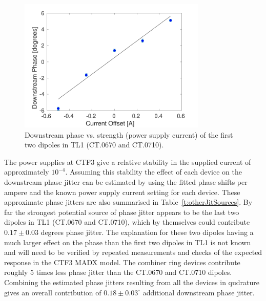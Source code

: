 \begin{figure}
  \centering
  \includegraphics[width=0.8\textwidth]{Figures/propagation/tl1670}
  \caption{Downstream phase vs. strength (power supply current) of the first two dipoles in TL1 (CT.0670 and CT.0710).}
  \label{f:tl1670}
\end{figure}



The power supplies at CTF3 give a relative stability in the supplied current of approximately \(10^{-4}\). Assuming this stability the effect of each device on the downstream phase jitter can be estimated by using the fitted phase shifts per ampere and the known power supply current setting for each device. These approximate phase jitters are also summarised in Table~\ref{t:otherJitSources}. By far the strongest potential source of phase jitter appears to be the last two dipoles in TL1 (CT.0670 and CT.0710), which by themselves could contribute \(0.17\pm0.03\) degrees phase jitter. 
The explanation for these two dipoles having a much larger effect on the phase than the first two dipoles in TL1 is not known and will need to be verified by repeated measurements and checks of the expected response in the CTF3 MADX model. The combiner ring devices contribute roughly 5 times less phase jitter than the CT.0670 and CT.0710 dipoles. 
Combining the estimated phase jitters resulting from all the devices in qudrature gives an overall contribution of \(0.18\pm0.03^\circ\) additional downstream phase jitter.

